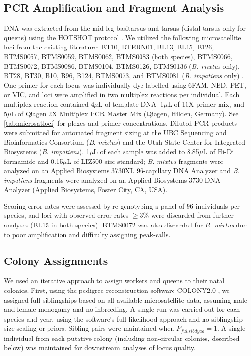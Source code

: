 \documentclass[12pt]{article}
\begin{document}
\subsection{PCR Amplification and Fragment Analysis}
DNA was extracted from the mid-leg basitarsus and tarsus (distal tarsus only for queens) using the HOTSHOT protocol \parencite{truettPreparationPCRqualityMouse2000}. We utilized the following microsatellite loci from the existing literature: BT10, BTERN01, BL13, BL15, B126, BTMS0057, BTMS0059, BTMS0062, BTMS0083 (both species), BTMS0066, BTMS0072, BTMS0086, BTMS0104, BTMS0126, BTMS0136 (\textit{B. mixtus} only), BT28, BT30, B10, B96, B124, BTMS0073, and BTMS0081 (\textit{B. impatiens} only) \parencite{estoupMonoandryPolyandryBumble1995, estoupGeneticDifferentiationContinental1996, reberfunkMicrosatelliteLociBombus2006, stolleNovelMicrosatelliteDNA2009}. One primer for each locus was individually dye-labelled using 6FAM, NED, PET, or VIC, and loci were amplified in two multiplex reactions per individual. Each multiplex reaction contained 4$\mu$L of template DNA, 1$\mu$L of 10X primer mix, and 5$\mu$L of Qiagen 2X Multiplex PCR Master Mix (Qiagen, Hilden, Germany). See \ref{tab:microsatloci} for plexes and primer concentrations. Diluted PCR products were submitted for automated fragment sizing at the UBC Sequencing and Bioinformatics Consortium (\textit{B. mixtus}) and the Utah State Center for Integrated Biosystems (\textit{B. impatiens}). 1$\mu$L of each sample was added to 8.85$\mu$L of Hi-Di formamide and 0.15$\mu$L of LIZ500 size standard; \textit{B. mixtus} fragments were analyzed on an Applied Biosystems 3730XL 96-capillary DNA Analyzer and \textit{B. impatiens} fragments were analyzed on an Applied Biosystems 3730 DNA Analyzer (Applied Biosystems, Foster City, CA, USA).

Scoring error rates were assessed by re-genotyping a panel of 96 individuals per species, and loci with observed error rates $\geq$3\% were discarded from further analyses (BL15 in both species). BTMS0072 was also discarded for \textit{B. mixtus} due to poor amplification and difficulty assigning peak-calls. 

\subsection{Colony Assignments}
We used an iterative approach to assign workers and queens to their natal colonies. First, using the pedigree reconstruction software COLONY2.0 \parencite{jonesCOLONYProgramParentage2010}, we assigned full siblingships based on all available microsatellite data, assuming male and female monogamy and no inbreeding. A single run was carried out for each species and year, using the software's full-likelihood approach and no siblingship size scaling or priors. Sibling pairs were maintained when $P_{fullsib dyad} = 1$. A single individual from each putative colony (including non-circular colonies, described below) was maintained for downstream analyses of locus quality.
\end{document}

